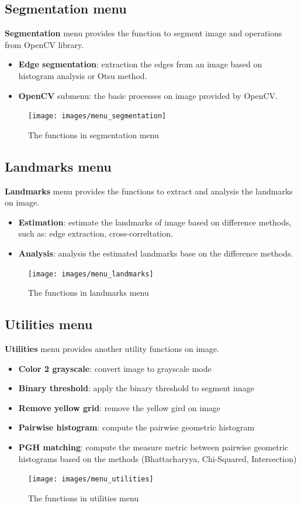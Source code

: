\subsection{Segmentation menu}
\textbf{Segmentation} menu provides the function to segment image and operations from OpenCV library.
\begin{itemize}
	\item \textbf{Edge segmentation}: extraction the edges from an image based on histogram analysis or Otsu method.
	\item \textbf{OpenCV} submenu: the basic processes on image provided by OpenCV.
\end{itemize}
\begin{figure}[h!]
\centering
\texttt{[image: images/menu\_segmentation]}
\caption{The functions in segmentation menu}
\label{fig:figure_31}
\end{figure}
\subsection{Landmarks menu}
\textbf{Landmarks} menu provides the functions to extract and analysis the landmarks on image.
\begin{itemize}
	\item \textbf{Estimation}: estimate the landmarks of image based on difference methods, such as: edge extraction, cross-correltation.
	\item \textbf{Analysis}: analysis the estimated landmarks base on the difference methods.
\end{itemize}
\begin{figure}[h!]
\centering
\texttt{[image: images/menu\_landmarks]}
\caption{The functions in landmarks menu}
\label{fig:figure_31}
\end{figure}
\subsection{Utilities menu}
\textbf{Utilities} menu provides another utility functions on image.
\begin{itemize}
	\item \textbf{Color 2 grayscale}: convert image to grayscale mode
	\item \textbf{Binary threshold}: apply the binary threshold to segment image
	\item \textbf{Remove yellow grid}: remove the yellow gird on image
	\item \textbf{Pairwise histogram}: compute the pairwise geometric histogram
	\item \textbf{PGH matching}: compute the measure metric between pairwise geometric histograms based on the methods (Bhattacharyya, Chi-Squared, Intersection)
\end{itemize}
\begin{figure}[h!]
\centering
\texttt{[image: images/menu\_utilities]}
\caption{The functions in utilities menu}
\label{fig:figure_31}
\end{figure}